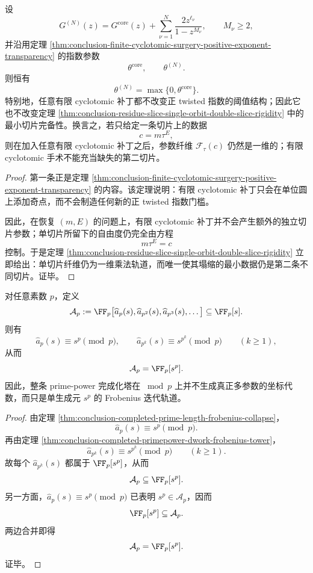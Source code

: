 \begin{theorem}\label{thm:conclusion-residue-cyclotomic-patch-cannot-replace-second-slice}
设
\[
G^{(N)}(z)=G^{\mathrm{core}}(z)+\sum_{\nu=1}^{N}\frac{2z^{\ell_\nu}}{1-z^{M_\nu}},
\qquad
M_\nu\ge 2,
\]
并沿用定理 \ref{thm:conclusion-finite-cyclotomic-surgery-positive-exponent-transparency} 的指数参数
\[
\theta^{\mathrm{core}},
\qquad
\theta^{(N)}.
\]
则恒有
\[
\theta^{(N)}=\max\{0,\theta^{\mathrm{core}}\}.
\]
特别地，任意有限 cyclotomic 补丁都不改变正 twisted 指数的阈值结构；因此它也不改变定理 \ref{thm:conclusion-residue-slice-single-orbit-double-slice-rigidity} 中的最小切片完备性。换言之，若只给定一条切片上的数据
\[
c=m\tau^E,
\]
则在加入任意有限 cyclotomic 补丁之后，参数纤维 \(\mathcal F_{\tau}(c)\) 仍然是一维的；有限 cyclotomic 手术不能充当缺失的第二切片。
\end{theorem}
\begin{proof}
第一条正是定理 \ref{thm:conclusion-finite-cyclotomic-surgery-positive-exponent-transparency} 的内容。该定理说明：有限 cyclotomic 补丁只会在单位圆上添加奇点，而不会制造任何新的正 twisted 指数门槛。

因此，在恢复 \((m,E)\) 的问题上，有限 cyclotomic 补丁并不会产生额外的独立切片参数；单切片所留下的自由度仍完全由方程
\[
m\tau^E=c
\]
控制。于是定理 \ref{thm:conclusion-residue-slice-single-orbit-double-slice-rigidity} 立即给出：单切片纤维仍为一维乘法轨道，而唯一使其塌缩的最小数据仍是第二条不同切片。证毕。
\end{proof}

\begin{theorem}\label{thm:conclusion-completed-primepower-frobenius-single-generator-collapse}
对任意素数 \(p\)，定义
\[
\mathcal A_p:=
\FF_p\bigl[\widehat a_p(s),\widehat a_{p^2}(s),\widehat a_{p^3}(s),\dots\bigr]
\subseteq \FF_p[s].
\]
则有
\[
\widehat a_p(s)\equiv s^p\pmod p,
\qquad
\widehat a_{p^k}(s)\equiv s^{p^k}\pmod p
\qquad (k\ge 1),
\]
从而
\[
\mathcal A_p=\FF_p[s^p].
\]
因此，整条 prime-power 完成化塔在 \(\bmod p\) 上并不生成真正多参数的坐标代数，而只是单生成元 \(s^p\) 的 Frobenius 迭代轨道。
\end{theorem}
\begin{proof}
由定理 \ref{thm:conclusion-completed-prime-length-frobenius-collapse}，
\[
\widehat a_p(s)\equiv s^p\pmod p.
\]
再由定理 \ref{thm:conclusion-completed-primepower-dwork-frobenius-tower}，
\[
\widehat a_{p^k}(s)\equiv s^{p^k}\pmod p
\qquad (k\ge 1).
\]
故每个 \(\widehat a_{p^k}(s)\) 都属于 \(\FF_p[s^p]\)，从而
\[
\mathcal A_p\subseteq \FF_p[s^p].
\]
另一方面，\(\widehat a_p(s)\equiv s^p\pmod p\) 已表明 \(s^p\in \mathcal A_p\)，因而
\[
\FF_p[s^p]\subseteq \mathcal A_p.
\]
两边合并即得
\[
\mathcal A_p=\FF_p[s^p].
\]
证毕。
\end{proof}

